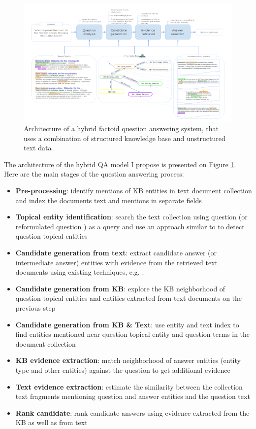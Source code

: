 \begin{figure}
\centering
\includegraphics[width=\textwidth]{img/text_and_kb}
\caption{Architecture of a hybrid factoid question answering system, that uses a combination of structured knowledge base and unstructured text data}
\label{fig:text_kb}
\end{figure}

The architecture of the hybrid QA model I propose is presented on Figure \ref{fig:text_kb}.
Here are the main stages of the question answering process:
\begin{itemize}
\setlength\itemsep{0em}
\item \textbf{Pre-processing}: identify mentions of KB entities in text document collection and index the documents text and mentions in separate fields
\item \textbf{Topical entity identification}: search the text collection using question (or reformulated question \cite{AgichteinLG01}) as a query and use an approach similar to \cite{cornolti2014smaph} to detect question topical entities
\item \textbf{Candidate generation from text}: extract candidate answer (or intermediate answer) entities with evidence from the retrieved text documents using existing techniques, e.g. \cite{tsai2015web}.
\item \textbf{Candidate generation from KB}: explore the KB neighborhood of question topical entities and entities extracted from text documents on the previous step
\item \textbf{Candidate generation from KB \& Text}: use entity and text index to find entities mentioned near question topical entity and question terms in the document collection
\item \textbf{KB evidence extraction}: match neighborhood of answer entities (entity type and other entities) against the question to get additional evidence
\item \textbf{Text evidence extraction}: estimate the similarity between the collection text fragments mentioning question and answer entities and the question text
\item \textbf{Rank candidate}: rank candidate answers using evidence extracted from the KB as well as from text
\end{itemize}

